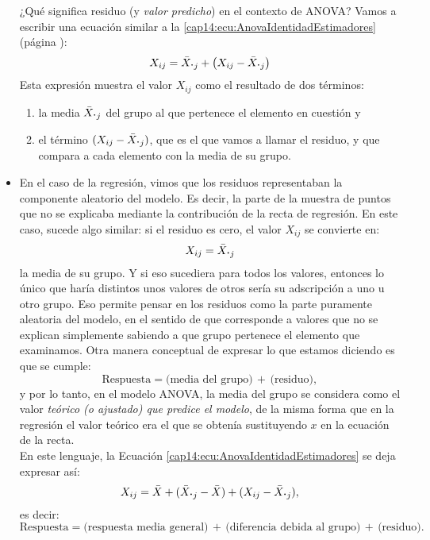 \begin{itemize}
        ¿Qué significa residuo (y {\em valor predicho}) en el contexto de ANOVA? Vamos a escribir una ecuación similar a la \ref{cap14:ecu:AnovaIdentidadEstimadores} (página \pageref{cap14:ecu:AnovaIdentidadEstimadores}):
        \[
        X_{ij}=\bar X_{\mbox{\bf\large $\cdot$}j}+\left(X_{ij}-\bar X_{\mbox{\bf\large $\cdot$}j}\right)
        \]
        Esta expresión muestra el valor $X_{ij}$ como el resultado de dos términos:
        \begin{enumerate}
            \item la media $\bar X_{\mbox{\bf\large $\cdot$}j}$ del grupo al que pertenece el elemento en cuestión y
            \item el término $(X_{ij}-\bar X_{\mbox{\bf\large $\cdot$}j})$, que es el que vamos a llamar el {\sf residuo}, y que compara a cada elemento con la media de su grupo.
        \end{enumerate}

    \item En el caso de la regresión, vimos que los residuos representaban la componente aleatorio del modelo. Es decir, la parte de la muestra de puntos que no se explicaba mediante la contribución de la recta de regresión. En este caso, sucede algo similar: si el residuo es cero, el valor $X_{ij}$ se convierte en:
        \[
        X_{ij}=\bar X_{\mbox{\bf\large $\cdot$}j}
        \]
        la media de su grupo. Y si eso sucediera para todos los valores, entonces lo único que haría distintos unos valores de otros sería su adscripción a uno u otro grupo. Eso permite pensar en los residuos como la parte puramente aleatoria del modelo, en el sentido de que corresponde a valores que no se explican simplemente sabiendo a que grupo pertenece el elemento que examinamos. Otra manera conceptual de expresar lo que estamos diciendo es que se cumple:
        \[\mbox{Respuesta}=\mbox{(media del grupo)}\,+\,\mbox{(residuo)},\]
        y por lo tanto, en el modelo ANOVA, la media del grupo se considera como el valor {\em teórico (o ajustado) que predice el modelo}, de la misma forma que en la regresión el valor teórico era el que se obtenía sustituyendo $x$ en la ecuación de la recta.\\
        En este lenguaje, la Ecuación \ref{cap14:ecu:AnovaIdentidadEstimadores} se deja expresar así:
        \[
        X_{ij}=\bar X+(\bar X_{\mbox{\bf\large $\cdot$}j}-\bar X)+(X_{ij}-\bar X_{\mbox{\bf\large $\cdot$}j}),
        \]
        es decir:
        \[\mbox{Respuesta}=\mbox{(respuesta media general)}\,+\,\mbox{(diferencia debida al grupo)}\,+\,\mbox{(residuo).}\]


\end{itemize}

